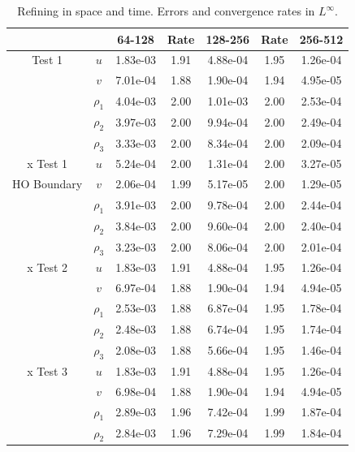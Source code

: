 \documentclass[final]{siamltex}
\begin{document}
\begin{table}[h]
\begin{center}
\caption{Refining in space and time.  Errors and convergence rates in $L^\infty$.}
\label{tab:Linf}
\begin{tabular}{ccccccc}
& & 64-128 & Rate & 128-256 & Rate & 256-512 \\
\hline
Test 1              & $u$      & 1.83e-03 & 1.91 & 4.88e-04 & 1.95 & 1.26e-04 \\
                    & $v$      & 7.01e-04 & 1.88 & 1.90e-04 & 1.94 & 4.95e-05 \\
                    & $\rho_1$ & 4.04e-03 & 2.00 & 1.01e-03 & 2.00 & 2.53e-04 \\
                    & $\rho_2$ & 3.97e-03 & 2.00 & 9.94e-04 & 2.00 & 2.49e-04 \\
                    & $\rho_3$ & 3.33e-03 & 2.00 & 8.34e-04 & 2.00 & 2.09e-04 \\
\hline
x Test 1            & $u$      & 5.24e-04 & 2.00 & 1.31e-04 & 2.00 & 3.27e-05 \\
HO Boundary         & $v$      & 2.06e-04 & 1.99 & 5.17e-05 & 2.00 & 1.29e-05 \\
                    & $\rho_1$ & 3.91e-03 & 2.00 & 9.78e-04 & 2.00 & 2.44e-04 \\
                    & $\rho_2$ & 3.84e-03 & 2.00 & 9.60e-04 & 2.00 & 2.40e-04 \\
                    & $\rho_3$ & 3.23e-03 & 2.00 & 8.06e-04 & 2.00 & 2.01e-04 \\
\hline
x Test 2            & $u$      & 1.83e-03 & 1.91 & 4.88e-04 & 1.95 & 1.26e-04 \\
                    & $v$      & 6.97e-04 & 1.88 & 1.90e-04 & 1.94 & 4.94e-05 \\
                    & $\rho_1$ & 2.53e-03 & 1.88 & 6.87e-04 & 1.95 & 1.78e-04 \\
                    & $\rho_2$ & 2.48e-03 & 1.88 & 6.74e-04 & 1.95 & 1.74e-04 \\
                    & $\rho_3$ & 2.08e-03 & 1.88 & 5.66e-04 & 1.95 & 1.46e-04 \\
\hline
x Test 3            & $u$      & 1.83e-03 & 1.91 & 4.88e-04 & 1.95 & 1.26e-04 \\
                    & $v$      & 6.98e-04 & 1.88 & 1.90e-04 & 1.94 & 4.94e-05 \\
                    & $\rho_1$ & 2.89e-03 & 1.96 & 7.42e-04 & 1.99 & 1.87e-04 \\
                    & $\rho_2$ & 2.84e-03 & 1.96 & 7.29e-04 & 1.99 & 1.84e-04 \\

\end{tabular}
\end{center}
\end{table}
\end{document}
